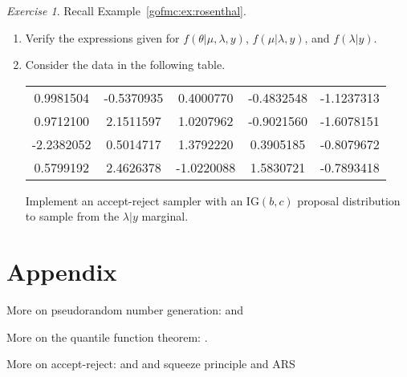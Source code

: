 \documentclass[12pt]{article}
\theoremstyle{plain}
\theoremstyle{definition}
\theoremstyle{remark}
\newtheorem{hw}{Exercise}[section]
\begin{document}
\begin{hw} \label{gofmc:hw:rosenthal}
Recall Example~\ref{gofmc:ex:rosenthal}.  
\begin{enumerate}
\item Verify the expressions given for $f(\theta| \mu, \lambda, y)$,
  $f(\mu | \lambda, y)$, and  
$f(\lambda |y)$. 
\item Consider the data in the following table.
\begin{table}
\begin{center}
\begin{tabular}{ccccc} 
  \hline
0.9981504 & -0.5370935 & 0.4000770 & -0.4832548 & -1.1237313 \\
0.9712100 & 2.1511597 & 1.0207962 & -0.9021560 & -1.6078151 \\
-2.2382052 & 0.5014717 & 1.3792220 & 0.3905185 & -0.8079672 \\
0.5799192 & 2.4626378 & -1.0220088 & 1.5830721 & -0.7893418 \\
  \hline
\end{tabular}
\end{center}
\end{table} 
Implement an accept-reject sampler with an $\text{IG}(b,c)$ proposal
distribution to sample from the $\lambda |y$ marginal.
\end{enumerate}
\end{hw}


\newpage

\section*{Appendix}

More on pseudorandom number generation: \citet{devr:1986} and \citet{fish:1996}

More on the quantile function theorem: \citet{angu:1994}.
 
More on accept-reject:  \citet{caff:boot:davi:2001} and \citet{mart:luen:migu:2012} and squeeze principle and ARS



\end{document}
